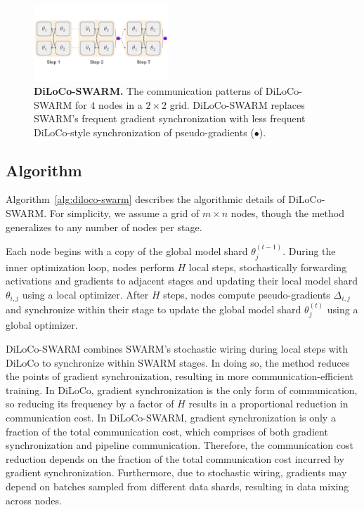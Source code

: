 \documentclass{article}
\newcommand{\purplecircle}{\textcolor{ppurple}{\LARGE$\bullet$}}
\begin{document}
\begin{figure}[ht]
    \centering
    \includegraphics[width=0.45\textwidth]{figures/diloco-swarm.pdf}
    \caption{\textbf{DiLoCo-SWARM.} The communication patterns of DiLoCo-SWARM for $4$ nodes in a $2\times 2$ grid. DiLoCo-SWARM replaces SWARM's frequent gradient synchronization with less frequent DiLoCo-style synchronization of pseudo-gradients (\purplecircle).}
    \label{fig:diloco-swarm}
\end{figure}

\subsection{Algorithm}

Algorithm~\ref{alg:diloco-swarm} describes the algorithmic details of DiLoCo-SWARM. For simplicity, we assume a grid of $m \times n$ nodes, though the method generalizes to any number of nodes per stage. 

Each node begins with a copy of the global model shard $\theta_j^{(t-1)}$. During the inner optimization loop, nodes perform $H$ local steps, stochastically forwarding activations and gradients to adjacent stages and updating their local model shard $\theta_{i,j}$ using a local optimizer. After $H$ steps, nodes compute pseudo-gradients $\Delta_{i,j}$ and synchronize within their stage to update the global model shard $\theta_j^{(t)}$ using a global optimizer.

DiLoCo-SWARM combines SWARM's stochastic wiring during local steps with DiLoCo to synchronize within SWARM stages. In doing so, the method reduces the points of gradient synchronization, resulting in more communication-efficient training. In DiLoCo, gradient synchronization is the only form of communication, so reducing its frequency by a factor of $H$ results in a proportional reduction in communication cost. In DiLoCo-SWARM, gradient synchronization is only a fraction of the total communication cost, which comprises of both gradient synchronization and pipeline communication. Therefore, the communication cost reduction depends on the fraction of the total communication cost incurred by gradient synchronization. Furthermore, due to stochastic wiring, gradients may depend on batches sampled from different data shards, resulting in data mixing across nodes.
\end{document}
